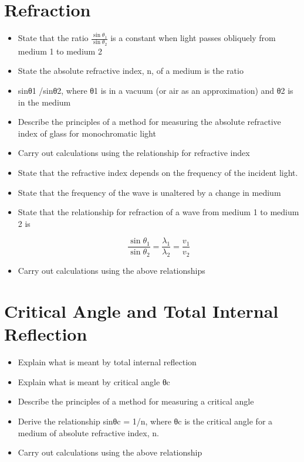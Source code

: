 \section{Refraction}
\begin{multicols}{2}
	\begin{itemize}
        \item State that the ratio $\frac{\sin\theta_1}{\sin\theta_2}$
            is a constant when light passes obliquely from medium 1 to medium
            2
        \item State the absolute refractive index, n, of a medium is the ratio
        \item sinθ1 /sinθ2, where θ1 is in a vacuum (or air as an approximation)
            and θ2 is in the medium
        \item Describe the principles of a method for measuring the absolute
            refractive index of glass for monochromatic light
        \item Carry out calculations using the relationship for refractive index
        \item State that the refractive index depends on the frequency of the
            incident light.
        \item State that the frequency of the wave is unaltered by a change in
            medium
        \item State that the relationship for refraction of a wave from medium
            1 to medium 2 is

            \[ \frac{\sin\theta_1}{\sin\theta_2} = \frac{\lambda_1}{\lambda_2} = \frac{v_1}{v_2}\]
        \item Carry out calculations using the above relationships
	\end{itemize}
\end{multicols}

\section{Critical Angle and Total Internal Reflection}
\begin{multicols}{2}
	\begin{itemize}
        \item Explain what is meant by total internal reflection
        \item Explain what is meant by critical angle θc
        \item Describe the principles of a method for measuring a critical angle
        \item Derive the relationship sinθc = 1/n, where θc is the critical angle for a
            medium of absolute refractive index, n.
        \item Carry out calculations using the above relationship
	\end{itemize}
\end{multicols}


